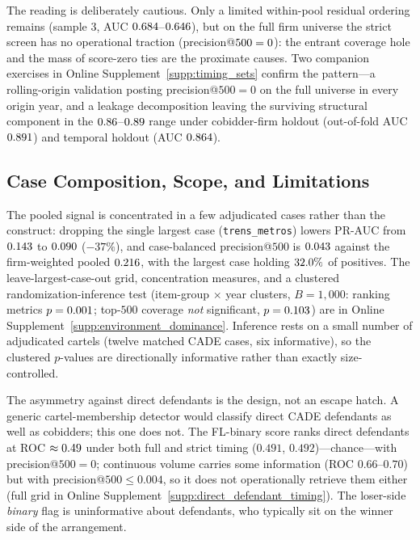 The reading is deliberately cautious. Only a limited within-pool residual
ordering remains (sample 3, AUC $0.684$--$0.646$),
but on the full firm universe the strict screen has no operational traction
(precision@$500=0$): the entrant coverage hole and the
mass of score-zero ties are the proximate causes. Two companion exercises
in Online Supplement~\ref{supp:timing_sets} confirm the pattern---a
rolling-origin validation posting precision@$500=0$ on the full universe in
every origin year, and a leakage decomposition leaving the surviving
structural component in the $0.86$--$0.89$ range
under cobidder-firm holdout (out-of-fold AUC $0.891$) and temporal
holdout (AUC $0.864$).

\subsection{Case Composition, Scope, and Limitations}
\label{app:loco_submission}
\label{app:environment_dominance_submission}
\label{app:direct_scope_submission}
\label{app:direct_defendant_timing_submission}
\label{app:opp_limitations_submission}
\label{app:timing_limitations_submission}

The pooled signal is concentrated in a few adjudicated cases rather than
the construct: dropping the single largest case (\texttt{trens\_metros})
lowers PR-AUC from $0.143$ to $0.090$
($-37\%$), and case-balanced precision@$500$ is $0.043$
against the firm-weighted pooled $0.216$, with the largest case
holding $32.0\%$ of positives. The leave-largest-case-out
grid, concentration measures, and a clustered randomization-inference
test (item-group $\times$ year clusters, $B=1{,}000$: ranking metrics
$p=0.001$; top-$500$ coverage \emph{not} significant,
$p=0.103$) are in Online
Supplement~\ref{supp:environment_dominance}. Inference rests on a small
number of adjudicated cartels (twelve matched CADE cases, six
informative), so the clustered $p$-values are directionally informative
rather than exactly size-controlled.

The asymmetry against direct defendants is the design, not an escape
hatch. A generic cartel-membership detector would classify direct CADE
defendants as well as cobidders; this one does not. The FL-binary score
ranks direct defendants at ROC $\approx 0.49$ under both
full and strict timing ($0.491$, $0.492$)---chance---with
precision@$500=0$; continuous volume carries some information (ROC
$0.66$--$0.70$) but with precision@$500\le0.004$, so it does not
operationally retrieve them either (full grid in Online
Supplement~\ref{supp:direct_defendant_timing}). The loser-side
\emph{binary} flag is uninformative about defendants, who typically sit on
the winner side of the arrangement.

